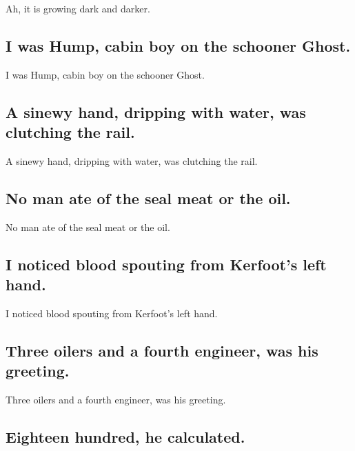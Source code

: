 \documentclass[]{article}
\begin{document}
Ah, it is growing dark and darker.

\hypertarget{i-was-hump-cabin-boy-on-the-schooner-ghost.}{%
\subsection{I was Hump, cabin boy on the schooner
Ghost.}\label{i-was-hump-cabin-boy-on-the-schooner-ghost.}}

I was Hump, cabin boy on the schooner Ghost.

\hypertarget{a-sinewy-hand-dripping-with-water-was-clutching-the-rail.}{%
\subsection{A sinewy hand, dripping with water, was clutching the
rail.}\label{a-sinewy-hand-dripping-with-water-was-clutching-the-rail.}}

A sinewy hand, dripping with water, was clutching the rail.

\hypertarget{no-man-ate-of-the-seal-meat-or-the-oil.}{%
\subsection{No man ate of the seal meat or the
oil.}\label{no-man-ate-of-the-seal-meat-or-the-oil.}}

No man ate of the seal meat or the oil.

\hypertarget{i-noticed-blood-spouting-from-kerfoots-left-hand.}{%
\subsection{I noticed blood spouting from Kerfoot's left
hand.}\label{i-noticed-blood-spouting-from-kerfoots-left-hand.}}

I noticed blood spouting from Kerfoot's left hand.

\hypertarget{three-oilers-and-a-fourth-engineer-was-his-greeting.}{%
\subsection{Three oilers and a fourth engineer, was his
greeting.}\label{three-oilers-and-a-fourth-engineer-was-his-greeting.}}

Three oilers and a fourth engineer, was his greeting.

\hypertarget{eighteen-hundred-he-calculated.}{%
\subsection{Eighteen hundred, he
calculated.}\label{eighteen-hundred-he-calculated.}}
\end{document}
